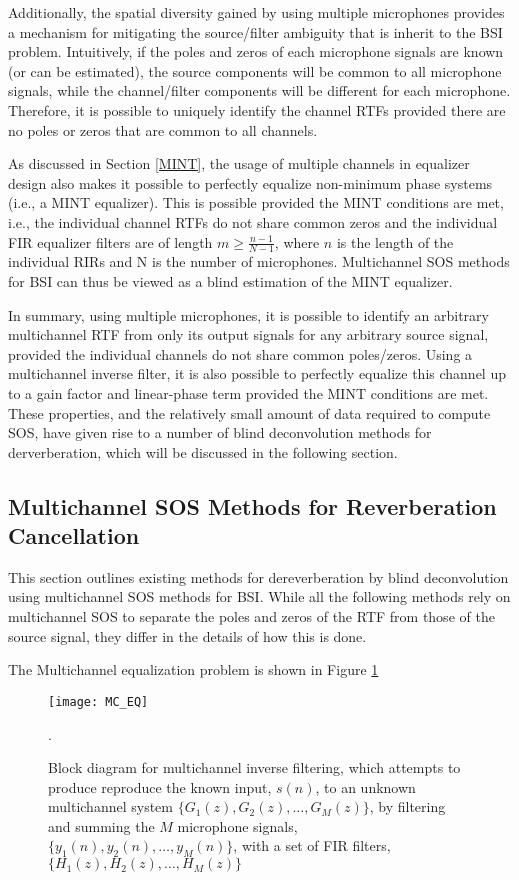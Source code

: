 Additionally, the spatial diversity gained by using multiple microphones provides a mechanism for mitigating the source/filter ambiguity that is inherit to the BSI problem. Intuitively, if the poles and zeros of each microphone signals are known (or can be estimated), the source components will be common to all microphone signals, while the channel/filter components will be different for each microphone. Therefore, it is possible to uniquely identify the channel RTFs provided there are no poles or zeros that are common to all channels.

As discussed in Section \ref{MINT}, the usage of multiple channels in equalizer design also makes it possible to perfectly equalize non-minimum phase systems (i.e., a MINT equalizer). This is possible provided the MINT conditions are met, i.e., the individual channel RTFs do not share common zeros and the individual FIR equalizer filters are of length $m \ge \frac{n-1}{N-1}$, where $n$ is the length of the individual RIRs and N is the number of microphones. Multichannel SOS methods for BSI can thus be viewed as a blind estimation of the MINT equalizer.

In summary, using multiple microphones, it is possible to identify an arbitrary multichannel RTF from only its output signals for any arbitrary source signal, provided the individual channels do not share common poles/zeros. Using a multichannel inverse filter, it is also possible to perfectly equalize this channel up to a gain factor and linear-phase term provided the MINT conditions are met. These properties, and the relatively small amount of data required to compute SOS, have given rise to a number of blind deconvolution methods for derverberation, which will be discussed in the following section.

\subsection{Multichannel SOS Methods for Reverberation Cancellation}

This section outlines existing methods for dereverberation by blind deconvolution using multichannel SOS methods for BSI. While all the following methods rely on multichannel SOS to separate the poles and zeros of the RTF from those of the source signal, they differ in the details of how this is done.

The Multichannel equalization problem is shown in Figure \ref{fig:MC_EQ}

\begin{figure}[H]
	\texttt{[image: MC\_EQ]}
	\centering
	\caption[Block diagram for the multichannel inverse filtering problem]{Block diagram for multichannel inverse filtering, which attempts to produce reproduce the known input, $s(n)$, to an unknown multichannel system $\{G_1(z), G_2(z), \dots, G_M(z)\}$, by filtering and summing the $M$ microphone signals, $\{y_1(n), y_2(n), \dots, y_M(n)\}$, with a set of FIR filters, $\{H_1(z), H_2(z), \dots, H_M(z)\}$}.
	\label{fig:MC_EQ}
\end{figure}

